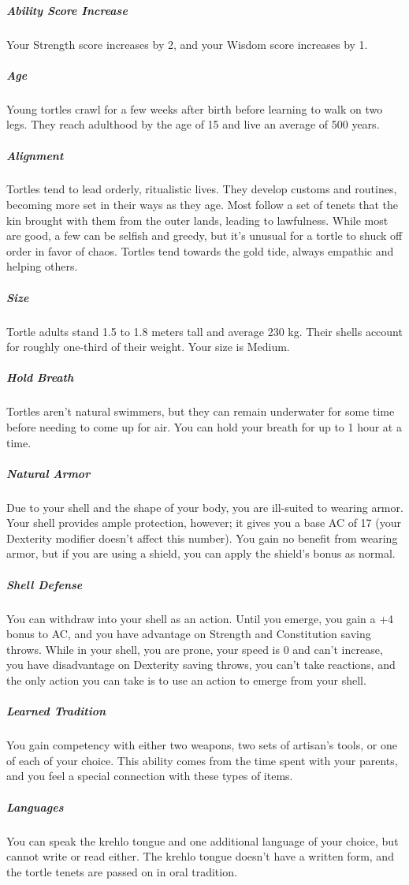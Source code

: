\begin{linenumbers}
\subparagraph{Ability Score Increase} Your Strength score increases by 2, and your Wisdom score increases by 1.

\subparagraph{Age} Young tortles crawl for a few weeks after birth before learning to walk on two legs.
They reach adulthood by the age of 15 and live an average of 500 years.

\subparagraph{Alignment} Tortles tend to lead orderly, ritualistic lives.
They develop customs and routines, becoming more set in their ways as they age.
Most follow a set of tenets that the kin brought with them from the outer lands, leading to lawfulness.
While most are good, a few can be selfish and greedy, but it's unusual for a tortle to shuck off order in favor of chaos.
Tortles tend towards the gold tide, always empathic and helping others.

\subparagraph{Size} Tortle adults stand 1.5 to 1.8 meters tall and average 230 kg.
Their shells account for roughly one-third of their weight.
Your size is Medium.

\subparagraph{Hold Breath} Tortles aren't natural swimmers, but they can remain underwater for some time before needing to come up for air.
You can hold your breath for up to 1 hour at a time.

\subparagraph{Natural Armor} Due to your shell and the shape of your body, you are ill-suited to wearing armor.
Your shell provides ample protection, however; it gives you a base AC of 17 (your Dexterity modifier doesn't affect this number).
You gain no benefit from wearing armor, but if you are using a shield, you can apply the shield's bonus as normal.

\subparagraph{Shell Defense} You can withdraw into your shell as an action.
Until you emerge, you gain a +4 bonus to AC, and you have advantage on Strength and Constitution saving throws.
While in your shell, you are prone, your speed is 0 and can't increase, you have disadvantage on Dexterity saving throws, you can't take reactions, and the only action you can take is to use an action to emerge from your shell.


\subparagraph{Learned Tradition} You gain competency with either two weapons, two sets of artisan's tools, or one of each of your choice.
This ability comes from the time spent with your parents, and you feel a special connection with these types of items.

\subparagraph{Languages} You can speak the krehlo tongue and one additional language of your choice, but cannot write or read either.
The krehlo tongue doesn't have a written form, and the tortle tenets are passed on in oral tradition.

\end{linenumbers}

\newpage
